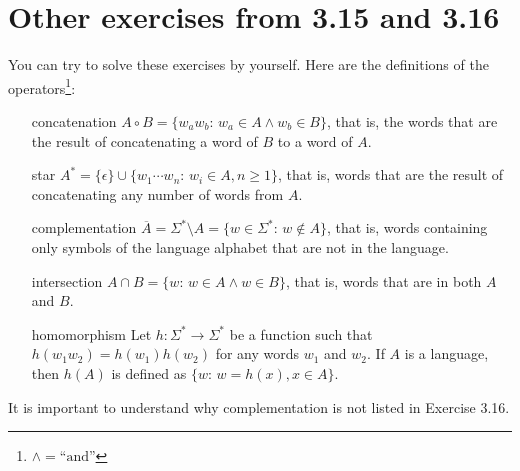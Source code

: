 \documentclass{article}
\newcommand{\0}{\texttt{\textvisiblespace}}
\newcommand{\°}{\obullet{\0}}
\newcommand{\st}{\colon\,}
\begin{document}
\section{Other exercises from 3.15 and 3.16}

You can try to solve these exercises by yourself. Here are the definitions of
the operators\footnote{\(\land = \text{``and''}\)}:
\begin{itemize}
\item[concatenation] \( A \circ B = \{ w_a w_b \st w_a \in A \land w_b \in
	B\}\), that is, the
	words that are the result of concatenating a word of \(B\) to a word of
	\(A\).
\item[star] \( A^* = \{ \epsilon \} \cup \{ w_1 \cdots w_n \st w_i \in A, n \ge
	1\}\), that is,
	words that are the result of concatenating any number of words from \(A\).
\item[complementation] \( \overline{A} = \Sigma^{*} \setminus A = \{ w \in \Sigma^{*} \st w \not \in A
	\}\), that is, words containing only symbols of the language alphabet that are not in the
	language.
\item[intersection] \( A \cap B = \{w \st w \in A \land w \in B\}\), that
	is, words that are in both \(A\) and \(B\).
\item[homomorphism] Let \(h \colon \Sigma^{*} \to \Sigma^{*}\)
	be a function such that \(h(w_1 w_2) = h(w_1) h(w_2)\) for any words
	\(w_1\) and \(w_2\). If \(A\) is
	a language, then \(h(A)\) is defined as \(\{ w \st w = h(x), x \in A\}\).
\end{itemize}

It is important to understand why complementation is not listed in Exercise 3.16.
\end{document}
